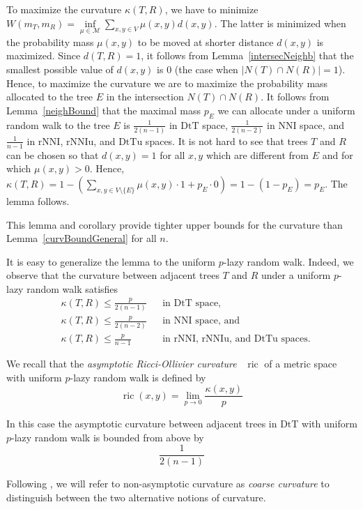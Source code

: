 \documentclass{amsart}
\theoremstyle{definition}
\newcommand{\nni}{\mathrm{NNI}}
\newcommand{\rnni}{\mathrm{rNNI}}
\newcommand{\rnniu}{\mathrm{rNNIu}}
\newcommand{\mdts}{\mathrm{DtT}}
\newcommand{\mdtsu}{\mathrm{DtTu}}
\newcommand{\ric}{\operatorname{ric}}
\newcommand{\M}{\mathcal{M}}
\begin{document}
\proof
To maximize the curvature $\kappa(T,R)$, we have to minimize $W(m_T,m_R) = \inf\limits_{\mu\in\M} \sum\limits_{x,y\in V}\mu(x,y) d(x,y)$.
The latter is minimized when the probability mass $\mu(x,y)$ to be moved at shorter distance $d(x,y)$ is maximized.
Since $d(T,R) = 1$, it follows from Lemma~\ref{intersecNeighb} that the smallest possible value of $d(x,y)$ is $0$ (the case when $|N(T) \cap N(R)| = 1$).
Hence, to maximize the curvature we are to maximize the probability mass allocated to the tree $E$ in the intersection $N(T) \cap N(R)$.
It follows from Lemma~\ref{neighBound} that the maximal mass $p_E$ we can allocate under a uniform random walk to the tree $E$ is $\frac{1}{2(n-1)}$ in $\mdts$ space, $\frac{1}{2(n-2)}$ in $\nni$ space, and $\frac{1}{n-1}$ in $\rnni$, $\rnniu$, and $\mdtsu$ spaces.
It is not hard to see that trees $T$ and $R$ can be chosen so that $d(x,y) = 1$ for all $x,y$ which are different from $E$ and for which $\mu(x,y) > 0$.
Hence, $\kappa(T, R) = 1 - \left(\sum\limits_{x,y\in V\setminus\{E\}}\mu(x,y)\cdot 1 + p_E \cdot 0\right) = 1 - (1-p_E) = p_E$.
The lemma follows.
\endproof

This lemma and corollary provide tighter upper bounds for the curvature than Lemma~\ref{curvBoundGeneral} for all $n$.

It is easy to generalize the lemma to the uniform $p$-lazy random walk.
Indeed, we observe that the curvature between adjacent trees $T$ and $R$ under a uniform $p$-lazy random walk satisfies
\begin{align*}
& \kappa(T,R) \leq \frac{p}{2(n-1)}	&& \mbox{in $\mdts$ space,}\\
& \kappa(T,R) \leq \frac{p}{2(n-2)}	&& \mbox{in $\nni$ space, and}\\
& \kappa(T,R) \leq \frac{p}{n-1}		&& \mbox{in $\rnni$, $\rnniu$, and $\mdtsu$ spaces.}
\end{align*}

We recall that the {\em asymptotic Ricci-Ollivier curvature}~\autocite{Loisel2014-gu} $\ric$ of a metric space with uniform $p$-lazy random walk is defined by
\[
\ric(x,y) = \lim_{p\to0} \frac{\kappa(x,y)}{p}
\]

In this case the asymptotic curvature between adjacent trees in $\mdts$ with uniform $p$-lazy random walk is bounded from above by
\[
\frac{1}{2(n-1)}
\]

Following \textcite{Loisel2014-gu}, we will refer to non-asymptotic curvature as {\em coarse curvature} to distinguish between the two alternative notions of curvature.
\end{document}
